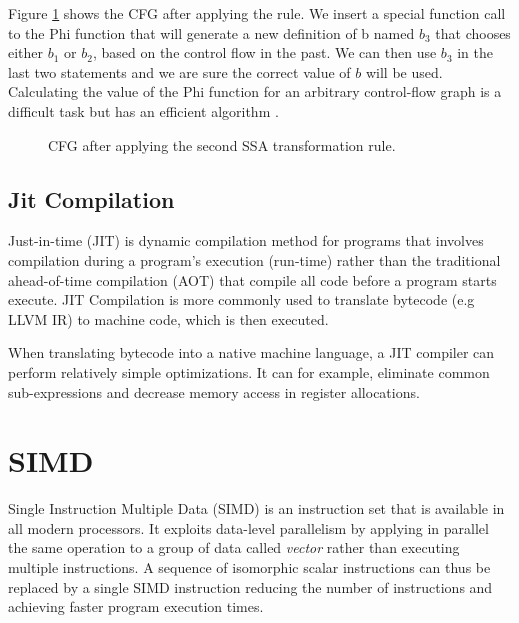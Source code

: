Figure \ref{fig:cfg3} shows the CFG after applying the rule. We insert a special function call to the Phi function that will generate a new definition of b named $b_3$ that chooses either $b_1$ or $b_2$, based on the control flow in the past. We can then use $b_3$ in the last two statements and we are sure the correct value of $b$ will be used.
Calculating the value of the Phi function for an arbitrary control-flow graph is a difficult task but has an efficient algorithm \cite{domalgo}.

\begin{figure}[htbp]
\centering
\usetikzlibrary{shapes,calc}
\caption{CFG after applying the second SSA transformation rule.}
\label{fig:cfg3}
\end{figure}


\subsection{Jit Compilation}
Just-in-time (JIT) is dynamic compilation method for programs that involves compilation during a program's execution (run-time) rather than the traditional ahead-of-time compilation (AOT) that compile all code before a program starts execute. JIT Compilation is more commonly used to translate bytecode (e.g LLVM IR) to machine code, which is then executed.

When translating bytecode into a native machine language, a JIT compiler can perform relatively simple optimizations. It can for example, eliminate common sub-expressions and decrease memory access in register allocations.

\section{SIMD}
Single Instruction Multiple Data (SIMD) is an instruction set that is available in all modern processors. It exploits data-level parallelism by applying in parallel the same operation to a group of data called \textit{vector} rather than executing multiple instructions. A sequence of isomorphic scalar instructions can thus be replaced by a single SIMD instruction reducing the number of instructions and achieving faster program execution times.

